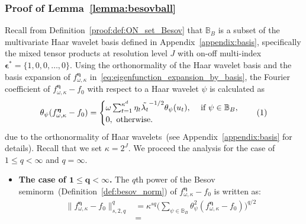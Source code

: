 \documentclass[twoside,11pt]{article}
\newcommand\numberthis{\addtocounter{equation}{1}\tag{\theequation}}
\newcommand{\vectorize}[1]{\mathbf{#1}}
\newcommand{\dimDensity}{d} %
\newcommand{\smoothness}{s}
\newcommand{\ONset}{\mathbb{B}}
\newcommand{\binNum}{\kappa}           %
\newcommand{\coef}{\theta}
\newcommand{\besovParamMicroscope}{q}
\newcommand{\primResLev}{J}
\begin{document}
\begin{appendix}
	\subsubsection{Proof of Lemma~\ref{lemma:besovball}}
	Recall from Definition~\ref{proof:def:ON_set_Besov} that \(\ONset_{B}\) is a subset of the multivariate Haar wavelet basis defined in Appendix~\ref{appendix:basis}, specifically the mixed tensor products at resolution level \(\primResLev\) with on-off multi-index \(\vectorize{\epsilon}^\ast = \{1,0,0,\ldots, 0\}\). Using the orthonormality of the Haar wavelet basis and the basis expansion of \(f^{{\boldsymbol{\eta}}}_{\omega, \binNum}\) in~\eqref{eq:eigenfunction_expansion_by_basis}, the Fourier coefficient of \(f^{{\boldsymbol{\eta}}}_{\omega, \binNum} - f_0\) with respect to a Haar wavelet \(\psi\) is calculated as
	\begin{align*}
		\coef_{\psi}
		(
		f^{{\boldsymbol{\eta}}}_{\omega, \binNum}
		-
		f_0
		)
		=
		\begin{cases}
			\omega \sum_{t=1}^{\binNum^{\dimDensity}} \eta_t \tilde{\lambda_t}^{-1/2} \coef_{\psi}(u_t),
			~
			&\text{if}~\psi \in \ONset_B,
			\\
			0,~\text{otherwise}.
		\end{cases}\numberthis \label{eq:two_sample_lower_bound_besov_coeff_calcul}
	\end{align*}
	\noindent
	due to the orthonormality of Haar wavelets~(see Appendix~\ref{appendix:basis} for details). Recall that we set $\binNum = 2^\primResLev$.
	We proceed the analysis for the case of $1 \leq \besovParamMicroscope < \infty$ and $\besovParamMicroscope = \infty$.
	\begin{itemize}
	\item \textbf{The case of $\mathbf{1 \leq \besovParamMicroscope < }\boldsymbol{\infty}$.}
	The $q$th power of the Besov seminorm~(Definition~\ref{def:besov_norm}) of $
	f^{{\boldsymbol{\eta}}}_{\omega, \binNum}
	-
	f_0
	$ is written as:
	\begin{align*}
		\|f^{{\boldsymbol{\eta}}}_{\omega, \binNum}
		-
		f_0\|^\besovParamMicroscope_{
			\smoothness,
			2,
			\besovParamMicroscope
		}
		& =
		\binNum^{\smoothness \besovParamMicroscope}
		\biggl(
		\sum_{
			\psi
			\in 
			\ONset_{B}
		}
		\coef^2_{\psi}
		(
		f^{{\boldsymbol{\eta}}}_{\omega, \binNum}
		-
		f_0
		)
		\biggr)^{\besovParamMicroscope/2}
		\\&=

\end{align*}
\end{itemize}
\end{appendix}
\end{document}
